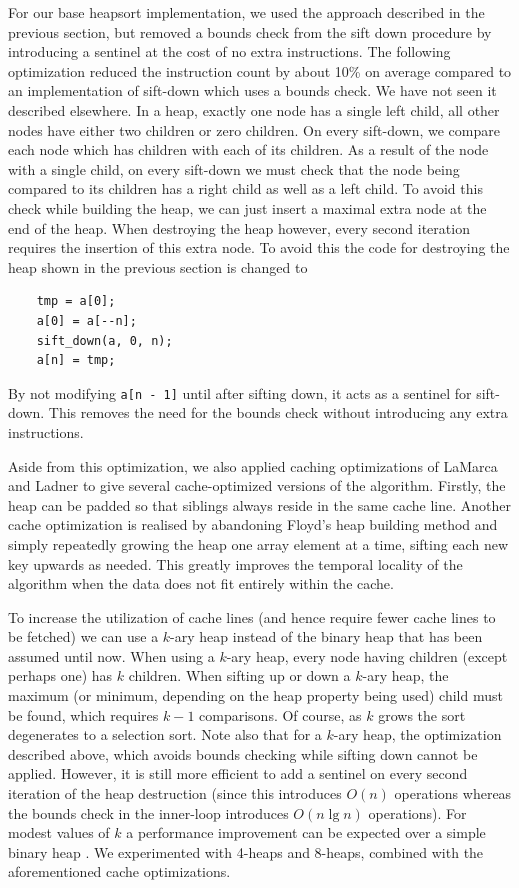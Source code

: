 \documentclass[acmtocl]{acmtrans2m}
\begin{document}
For our base heapsort implementation, we used the approach described in the
previous section, but removed a bounds check from the sift down procedure by
introducing a sentinel at the cost of no extra instructions. The following
optimization reduced the instruction count by about 10\% on average compared to
an implementation of sift-down which uses a bounds check. We have not seen it
described elsewhere. In a heap, exactly one node has a single left child, all
other nodes have either two children or zero children. On every sift-down, we
compare each node which has children with each of its children. As a result of
the node with a single child, on every sift-down we must check that the node
being compared to its children has a right child as well as a left child. To
avoid this check while building the heap, we can just insert a maximal extra
node at the end of the heap. When destroying the heap however, every second
iteration requires the insertion of this extra node. To avoid this the code for
destroying the heap shown in the previous section is changed to

\begin{verbatim}
    tmp = a[0];
    a[0] = a[--n];
    sift_down(a, 0, n);
    a[n] = tmp;
\end{verbatim}

\noindent 
By not modifying \texttt{a[n - 1]} until after sifting down, it acts as a
sentinel for sift-down. This removes the need for the bounds check without
introducing any extra instructions.

Aside from this optimization, we also applied caching optimizations of LaMarca
and Ladner \citeyear{LaMarca96b} to give several cache-optimized versions of the
algorithm. Firstly, the heap can be padded so that siblings always reside in the
same cache line. Another cache optimization is realised by abandoning Floyd's
heap building method and simply repeatedly growing the heap one array element at
a time, sifting each new key upwards as needed. This greatly improves the
temporal locality of the algorithm when the data does not fit entirely within
the cache. 

To increase the utilization of cache lines (and hence require fewer cache lines
to be fetched) we can use a $k$-ary heap instead of the binary heap that has
been assumed until now. When using a $k$-ary heap, every node having children
(except perhaps one) has $k$ children. When sifting up or down a $k$-ary heap,
the maximum (or minimum, depending on the heap property being used) child must
be found, which requires $k - 1$ comparisons. Of course, as $k$ grows the sort
degenerates to a selection sort. Note also that for a $k$-ary heap, the
optimization described above, which avoids bounds checking while sifting down
cannot be applied. However, it is still more efficient to add a sentinel on
every second iteration of the heap destruction (since this introduces $O(n)$
operations whereas the bounds check in the inner-loop introduces $O(n \lg n)$
operations). For modest values of $k$ a performance improvement can be expected
over a simple binary heap \cite{LaMarca96b}. We experimented with 4-heaps and
8-heaps, combined with the aforementioned cache optimizations.
\end{document}
